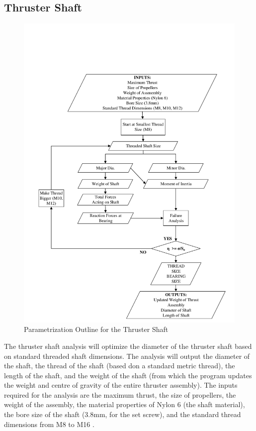 \documentclass[../main.tex]{subfiles}
\begin{document}
\subsection{Thruster Shaft} \label{thrustShaft}

\begin{figure}[H]
	\centering
	\includegraphics[width=.9\linewidth]{img/paramaterization/thrusterShaft.pdf}
	\caption{Parametrization Outline for the Thruster Shaft}
	\label{fig:ThrusterShaftParametrization}
\end{figure}

The thruster shaft analysis will optimize the diameter of the thruster shaft based on standard threaded shaft dimensions. The analysis will output the diameter of the shaft, the thread of the shaft (based don a standard metric thread), the length of the shaft, and the weight of the shaft (from which the program updates the weight and centre of gravity of the entire thruster assembly). The inputs required for the analysis are the maximum thrust, the size of propellers, the weight of the assembly, the material properties of Nylon 6 \cite{Nylon6} (the shaft material), the bore size of the shaft  (3.8mm, for the set screw), and the standard thread dimensions from M8 to M16 \cite{threadSizes}.\\
\end{document}
